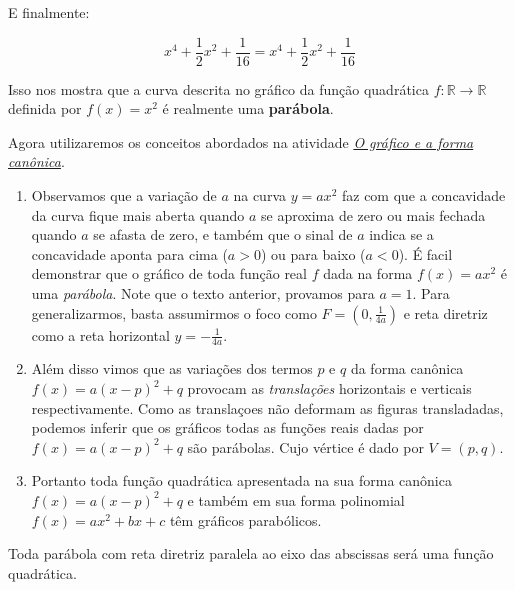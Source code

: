 E finalmente:

$$x^4+\frac{1}{2}x^2+\frac{1}{16}=x^4+\frac{1}{2}x^2+\frac{1}{16}$$

Isso nos mostra que a curva descrita no gráfico da função quadrática \(f:\mathbb{R}\to\mathbb{R}\) definida por \(f(x)=x^2\) é realmente uma \textbf{parábola}.

Agora utilizaremos os conceitos abordados na atividade \hyperref[\detokenize{AF209-5:ativ-funcao-quadratica-graf-curva}]{\textit{O gráfico e a forma canônica}}.
\begin{enumerate}
\item {} 
Observamos que a variação de \(a\) na curva \(y=ax^2\) faz com que a concavidade da curva fique mais aberta quando \(a\) se aproxima de zero ou mais fechada quando \(a\) se afasta de zero, e também que o sinal de \(a\) indica se a concavidade aponta para cima (\(a>0\)) ou para baixo (\(a<0\)). É facil demonstrar que o gráfico de toda função real \(f\) dada na forma \(f(x)=ax^2\) é uma \textit{parábola}. Note que o texto anterior, provamos para \(a=1\). Para generalizarmos, basta assumirmos o foco como \(F=(0,\frac{1}{4a})\) e reta diretriz como a reta horizontal \(y=-\frac{1}{4a}\).

\item {} 
Além disso vimos que as variações dos termos \(p\) e \(q\) da forma canônica \(f(x)=a(x-p)^2+q\) provocam as \textit{translações} horizontais e verticais respectivamente. Como as translaçoes não deformam as figuras transladadas, podemos inferir que os gráficos todas as funções reais dadas por \(f(x)=a(x-p)^2+q\) são parábolas. Cujo vértice é dado por \(V=(p,q)\).

\item {} 
Portanto toda função quadrática apresentada na sua forma canônica \(f(x)=a(x-p)^2+q\) e também em sua forma polinomial \(f(x)=ax^2+bx+c\) têm gráficos parabólicos.

\end{enumerate}

\begin{observation}
Toda parábola com reta diretriz paralela ao eixo das abscissas será uma função quadrática.
\end{observation}

